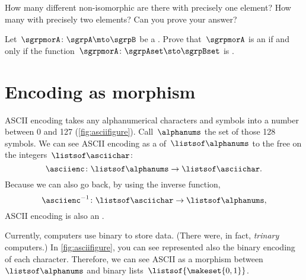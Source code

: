
\begin{gradedexercise}
    \label{ex:non-isomorphic}
    How many different non-isomorphic  are there with precisely one element?
    How many with precisely two elements?
    Can you prove your answer?
\end{gradedexercise}

\begin{gradedexercise}
    \label{ex:CharacterizeSemigroupIsos}
    \label{ex:semi-morph}
    Let~$\sgrpmorA\colon \sgrpA \mto \sgrpB$ be a .
    Prove that~$\sgrpmorA$ is an  if and only if the function~$\sgrpmorA \colon \sgrpAset \sto \sgrpBset$ is .
\end{gradedexercise}

\section{Encoding as morphism }

\begin{example}
    ASCII encoding takes any alphanumerical characters and symbols into a number between 0 and 127 (\cref{fig:asciifigure}).
    Call~$\alphanums$ the set of those 128 symbols.
    We can see ASCII encoding as a  of~$\listsof\alphanums$ to the free  on the integers~$\listsof\asciichar$:
    \begin{equation}
        \label{eq:ASCII-semi}
        \asciienc\colon \listsof\alphanums \to \listsof\asciichar.
    \end{equation}
    Because we can also go back, by using the inverse function,
    \begin{equation}
        \label{eq:ASCII-semi-inv}
        \asciienc^{-1}\colon \listsof\asciichar \to \listsof\alphanums,
    \end{equation}
    ASCII encoding is also an .
\end{example}

\begin{example}
    Currently, computers use binary to store data. (There were, in fact, \emph{trinary} computers.)
    In \cref{fig:asciifigure}, you can see represented also the binary encoding of each character.
    Therefore, we can see ASCII as a morphism between~$\listsof\alphanums$ and binary lists~$\listsof{\makeset{0,1}}$.
\end{example}

